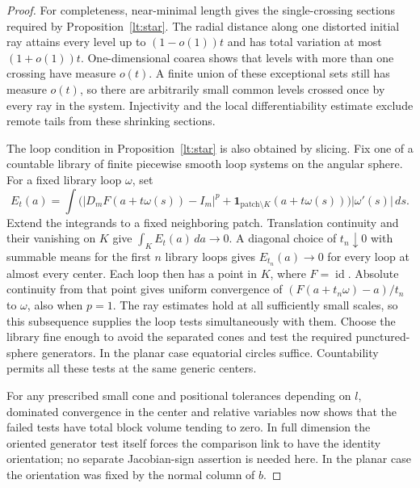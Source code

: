 \documentclass[11pt]{article}
\numberwithin{equation}{section}
\theoremstyle{definition}
\theoremstyle{remark}
\begin{document}
\begin{proof}
For completeness, near-minimal length gives the single-crossing
sections required by Proposition~\ref{lt:star}.  The radial distance along
one distorted initial ray attains every level up to $(1-o(1))t$ and
has total variation at most $(1+o(1))t$.  One-dimensional coarea shows
that levels with more than one crossing have measure $o(t)$.  A finite
union of these exceptional sets still has measure $o(t)$, so there
are arbitrarily small common levels crossed once by every ray in
the system.  Injectivity and the local differentiability estimate
exclude remote tails from these shrinking sections.

The loop condition in Proposition~\ref{lt:star} is also obtained by slicing.
Fix one of a countable library of finite piecewise smooth loop
systems on the angular sphere.  For a fixed library loop $\omega$, set
\[
 E_t(a)=\int\bigl(|D_mF(a+t\omega(s))-I_m|^p
       +\mathbf1_{\text{patch}\setminus K}(a+t\omega(s))\bigr)
                         |\omega'(s)|\,ds.
\]
Extend the integrands to a fixed neighboring patch.  Translation
continuity and their vanishing on $K$ give
$\int_K E_t(a)\,da\to0$.  A diagonal choice of $t_n\downarrow0$
with summable means for the first $n$ library loops gives
$E_{t_n}(a)\to0$ for every loop at almost every center.  Each loop
then has a point in $K$, where $F=\operatorname{id}$.  Absolute continuity from
that point gives uniform convergence of
$(F(a+t_n\omega)-a)/t_n$ to $\omega$, also when $p=1$.
The ray estimates hold at all sufficiently small scales, so this
subsequence supplies the loop tests simultaneously with them.
Choose the library fine enough to avoid the separated cones and test
the required punctured-sphere generators.  In the planar case
equatorial circles suffice.  Countability permits all these tests at
the same generic centers.

For any prescribed small cone and positional tolerances depending on
$l$, dominated convergence in the center and relative variables now
shows that the failed tests have total block volume tending to zero.
In full dimension the oriented generator test itself forces the
comparison link to have the identity orientation; no separate
Jacobian-sign assertion is needed here.  In the planar case the
orientation was fixed by the normal column of $b$.


\end{proof}
\end{document}
